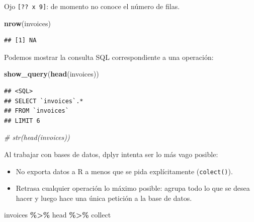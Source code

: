 \documentclass[
]{book}
\newenvironment{Shaded}{\begin{snugshade}}{\end{snugshade}}
\newcommand{\CommentTok}[1]{\textcolor[rgb]{0.56,0.35,0.01}{\textit{#1}}}
\newcommand{\FunctionTok}[1]{\textcolor[rgb]{0.13,0.29,0.53}{\textbf{#1}}}
\newcommand{\NormalTok}[1]{#1}
\newcommand{\SpecialCharTok}[1]{\textcolor[rgb]{0.81,0.36,0.00}{\textbf{#1}}}
\begin{document}
Ojo \texttt{{[}??\ x\ 9{]}}: de momento no conoce el número de filas.

\begin{Shaded}
\begin{Highlighting}[]
\FunctionTok{nrow}\NormalTok{(invoices)}
\end{Highlighting}
\end{Shaded}

\begin{verbatim}
## [1] NA
\end{verbatim}

Podemos mostrar la consulta SQL correspondiente a una operación:

\begin{Shaded}
\begin{Highlighting}[]
\FunctionTok{show\_query}\NormalTok{(}\FunctionTok{head}\NormalTok{(invoices))}
\end{Highlighting}
\end{Shaded}

\begin{verbatim}
## <SQL>
## SELECT `invoices`.*
## FROM `invoices`
## LIMIT 6
\end{verbatim}

\begin{Shaded}
\begin{Highlighting}[]
\CommentTok{\# str(head(invoices))}
\end{Highlighting}
\end{Shaded}

Al trabajar con bases de datos, dplyr intenta ser lo más vago posible:

\begin{itemize}
\item
  No exporta datos a R a menos que se pida explícitamente (\texttt{colect()}).
\item
  Retrasa cualquier operación lo máximo posible:
  agrupa todo lo que se desea hacer y luego hace una única petición a la base de datos.
\end{itemize}

\begin{Shaded}
\begin{Highlighting}[]
\NormalTok{invoices }\SpecialCharTok{\%\textgreater{}\%}\NormalTok{ head }\SpecialCharTok{\%\textgreater{}\%}\NormalTok{ collect}
\end{Highlighting}
\end{Shaded}
\end{document}
